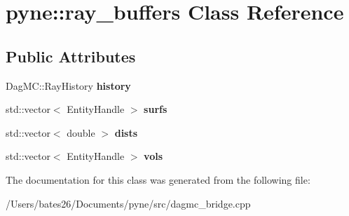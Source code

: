 \hypertarget{classpyne_1_1ray__buffers}{\section{pyne\+:\+:ray\+\_\+buffers Class Reference}
\label{classpyne_1_1ray__buffers}
}
\subsection*{Public Attributes}
\begin{DoxyCompactItemize}
\item 
\hypertarget{classpyne_1_1ray__buffers_adb3331dbf290b1c6d44c37931a917a7e}{Dag\+M\+C\+::\+Ray\+History {\bfseries history}}\label{classpyne_1_1ray__buffers_adb3331dbf290b1c6d44c37931a917a7e}

\item 
\hypertarget{classpyne_1_1ray__buffers_ac2a784c86703f7253861ceaa73ba5e6b}{std\+::vector$<$ Entity\+Handle $>$ {\bfseries surfs}}\label{classpyne_1_1ray__buffers_ac2a784c86703f7253861ceaa73ba5e6b}

\item 
\hypertarget{classpyne_1_1ray__buffers_a2904cd95dd5c1cb04ca796cf025bced1}{std\+::vector$<$ double $>$ {\bfseries dists}}\label{classpyne_1_1ray__buffers_a2904cd95dd5c1cb04ca796cf025bced1}

\item 
\hypertarget{classpyne_1_1ray__buffers_a2d059fcf9432e03b28eade60308b2498}{std\+::vector$<$ Entity\+Handle $>$ {\bfseries vols}}\label{classpyne_1_1ray__buffers_a2d059fcf9432e03b28eade60308b2498}

\end{DoxyCompactItemize}


The documentation for this class was generated from the following file\+:\begin{DoxyCompactItemize}
\item 
/\+Users/bates26/\+Documents/pyne/src/dagmc\+\_\+bridge.\+cpp\end{DoxyCompactItemize}
